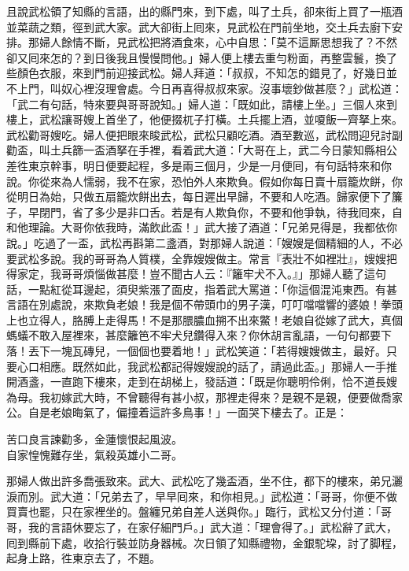 且說武松領了知縣的言語，出的縣門來，到下處，叫了土兵，卻來街上買了一瓶酒並菜蔬之類，徑到武大家。武大卻街上囘來，見武松在門前坐地，交土兵去廚下安排。那婦人餘情不斷，見武松把將酒食來，心中自思：「莫不這厮思想我了？不然卻又囘來怎的？到日後我且慢慢問他。」婦人便上樓去重勻粉面，再整雲鬟，換了些顏色衣服，來到門前迎接武松。婦人拜道：「叔叔，不知怎的錯見了，好幾日並不上門，叫奴心裡沒理會處。今日再喜得叔叔來家。沒事壞鈔做甚麼？」武松道：「武二有句話，特來要與哥哥說知。」婦人道：「既如此，請樓上坐。」三個人來到樓上，武松讓哥嫂上首坐了，他便掇杌子打橫。土兵擺上酒，並嗄飯一齊拏上來。武松勸哥嫂吃。婦人便把眼來睃武松，武松只顧吃酒。酒至數巡，武松問迎兒討副勸盃，叫土兵篩一盃酒拏在手裡，看着武大道：「大哥在上，武二今日蒙知縣相公差徃東京幹事，明日便要起程，多是兩三個月，少是一月便囘，有句話特來和你說。你從來為人懦弱，我不在家，恐怕外人來欺負。假如你每日賣十扇籠炊餅，你從明日為始，只做五扇籠炊餅出去，每日遲出早歸，不要和人吃酒。歸家便下了簾子，早閉門，省了多少是非口舌。若是有人欺負你，不要和他爭執，待我囘來，自和他理論。大哥你依我時，滿飲此盃！」武大接了酒道：「兄弟見得是，我都依你說。」吃過了一盃，武松再斟第二盞酒，對那婦人說道：「嫂嫂是個精細的人，不必要武松多說。我的哥哥為人質樸，全靠嫂嫂做主。常言『表壯不如裡壯』，嫂嫂把得家定，我哥哥煩惱做甚麼！豈不聞古人云：『籬牢犬不入。』」{}那婦人聽了這句話，一點紅從耳邊起，須臾紫漲了面皮，指着武大罵道：「你這個混沌東西。有甚言語在別處說，來欺負老娘！我是個不帶頭巾的男子漢，叮叮噹噹響的婆娘！拳頭上也立得人，胳膊上走得馬！不是那腲膿血搠不出來鱉！老娘自從嫁了武大，真個螞蟻不敢入屋裡來，甚麼籬笆不牢犬兒鑽得入來？你休胡言亂語，一句句都要下落！丟下一塊瓦磚兒，一個個也要着地！」{}武松笑道：「若得嫂嫂做主，最好。只要心口相應。既然如此，我武松都記得嫂嫂說的話了，請過此盃。」那婦人一手推開酒盞，一直跑下樓來，走到在胡梯上，發話道：「既是你聰明伶俐，恰不道長嫂為母。我初嫁武大時，不曾聽得有甚小叔，那裡走得來？是親不是親，便要做喬家公。自是老娘晦氣了，偏撞着這許多鳥事！」{}一面哭下樓去了。正是：

\begin{myquote}
苦口良言諫勸多，金蓮懷恨起風波。\\自家惶愧難存坐，氣殺英雄小二哥。
\end{myquote}

那婦人做出許多喬張致來。武大、武松吃了幾盃酒，坐不住，都下的樓來，弟兄灑淚而別。武大道：「兄弟去了，早早囘來，和你相見。」武松道：「哥哥，你便不做買賣也罷，{}只在家裡坐的。盤纏兄弟自差人送與你。」臨行，武松又分付道：「哥哥，我的言語休要忘了，在家仔細門戶。」武大道：「理會得了。」武松辭了武大，囘到縣前下處，收拾行裝並防身器械。次日領了知縣禮物，金銀駝垜，討了脚程，起身上路，徃東京去了，不題。

